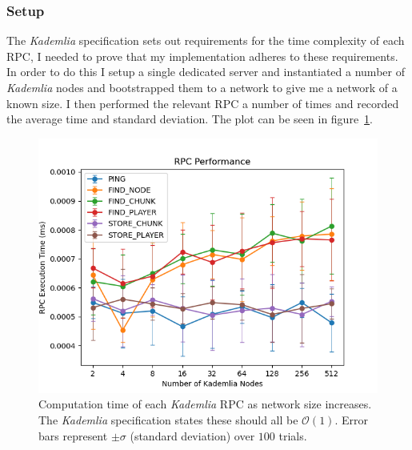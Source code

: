 \documentclass[12pt,notitlepage,a4paper]{report}
\newcommand{\kademlia}{\emph{Kademlia}}
\begin{document}
	\subsubsection{Setup}
	The \kademlia{} specification sets out requirements for the time complexity of each RPC, I needed to prove that my implementation adheres to these requirements. In order to do this I setup a single dedicated server and instantiated a number of \kademlia{} nodes and bootstrapped them to a network to give me a network of a known size. I then performed the relevant RPC a number of times and recorded the average time and standard deviation. The plot can be seen in figure~\ref{fig:kadperforma}.
	\begin{figure}[!ht]
		\includegraphics[width=\textwidth]{rpcperformance.png}
		\caption[RPC Performance]{Computation time of each \kademlia{} RPC as network size increases. The \kademlia{} specification states these should all be $\mathcal{O}(1)$. Error bars represent $\pm\sigma$ (standard deviation) over $100$ trials.}
		\label{fig:kadperforma}
	\end{figure}
\end{document}
